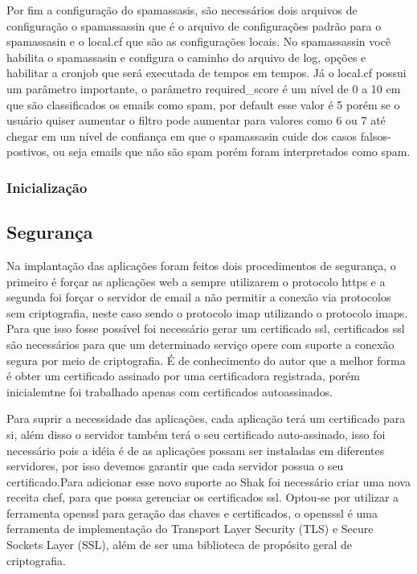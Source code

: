 Por fim a configuração do spamassasis, são necessários dois arquivos de configuração
o spamassassin que é o arquivo de configurações padrão para o spamassasin e o
local.cf que são as configurações locais. No spamassassin você habilita o spamassasin
e configura o caminho do arquivo de log, opções e habilitar a cronjob que será
executada de tempos em tempos. Já o local.cf possui um parâmetro importante, o
parâmetro required\_score é um nível de 0 a 10 em que são classificados os emails
como spam, por default esse valor é 5 porém se o usuário quiser aumentar o filtro
pode aumentar para valores como 6 ou 7 até chegar em um nível de confiança em que
o spamassasin cuide dos casos falsos-postivos, ou seja emails que não são spam
porém foram interpretados como spam.

\subsubsection{Inicialização}





\subsection{Segurança}
\label{sub:prototipo}

Na implantação das aplicações foram feitos dois procedimentos de segurança, o primeiro
é forçar as aplicações web a sempre utilizarem o protocolo https e a segunda foi forçar o
servidor de email a não permitir a conexão via protocolos sem criptografia, neste
caso sendo o protocolo imap utilizando o protocolo imaps. Para que isso fosse possível
foi necessário gerar um certificado ssl, certificados ssl são necessários para
que um determinado serviço opere com suporte a conexão segura por meio de criptografia.
É de conhecimento do autor que a melhor forma é obter um certificado assinado
por uma certificadora registrada, porém inicialemtne foi trabalhado apenas com certificados
autoassinados.

Para suprir a necessidade das aplicações, cada aplicação terá um certificado para
si, além disso o servidor também terá o seu certificado auto-assinado, isso foi necessário
pois a idéia é de as aplicações possam ser instaladas em diferentes servidores, por
isso devemos garantir que cada servidor possua o seu certificado.Para adicionar
esse novo suporte ao Shak foi necessário criar uma nova receita chef,
para que possa gerenciar os certificados ssl. Optou-se por utilizar a ferramenta
openssl para geração das chaves e certificados, o opensssl é uma ferramenta de
implementação do Transport Layer Security (TLS) e Secure Sockets Layer (SSL),
além de ser uma biblioteca de propósito geral de criptografia\cite{openssl}.

